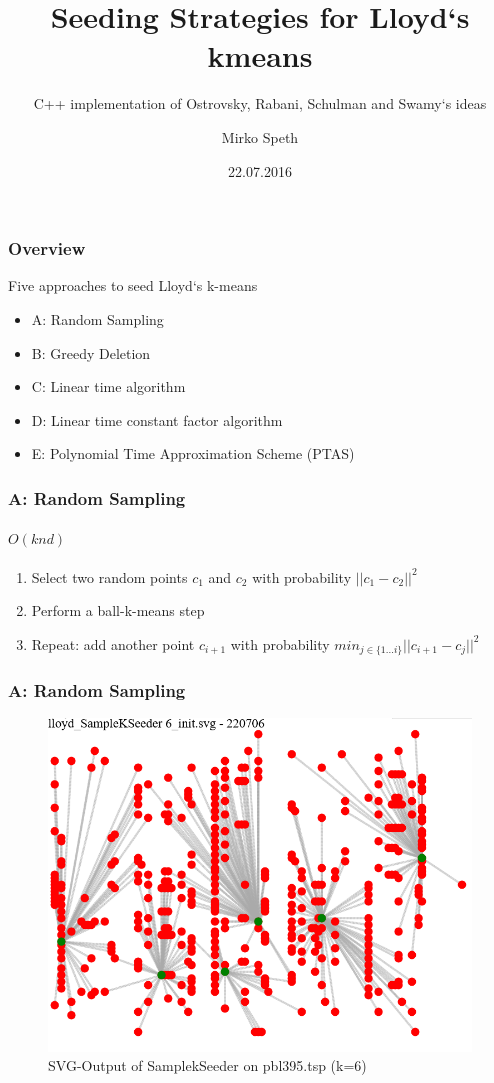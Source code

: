 \documentclass{beamer}
\title{Seeding Strategies for Lloyd`s kmeans}
\subtitle{C++ implementation of Ostrovsky, Rabani, Schulman and Swamy`s ideas}
\author{Mirko Speth}
\date{22.07.2016}
\begin{document}
  \frame{\titlepage}
  \begin{frame}
    \frametitle{Overview}
    Five approaches to seed Lloyd`s k-means
    \begin{itemize}
        \item{A: Random Sampling}
        \item{B: Greedy Deletion}
        \item{C: Linear time algorithm}
        \item{D: Linear time constant factor algorithm}
        \item{E: Polynomial Time Approximation Scheme (PTAS)}
    \end{itemize}
  \end{frame}
  
  
  
  
  \begin{frame}
    \frametitle{A: Random Sampling}
    \framesubtitle{$O(knd)$}
    \begin{enumerate}
        \item Select two random points $c_1$ and $c_2$ with probability $||c_1-c_2||^2$
        \item Perform a ball-k-means step
        \item Repeat: add another point $c_{i+1}$ with probability $min_{j\in\{1...i\}}{||c_{i+1}-c_j||^2}$
    \end{enumerate}
  \end{frame}
  
  \begin{frame}[fragile]
\frametitle{A: Random Sampling}
\begin{figure}[ht]
	\centering
	\includegraphics[scale=0.4]{SamplekSeeder_pbl395.PNG}
	\caption{SVG-Output of SamplekSeeder on pbl395.tsp (k=6)}
\end{figure}
\end{frame}
  
\end{document}
